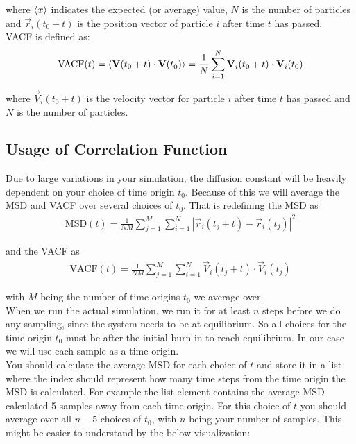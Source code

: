 \documentclass{article}
\begin{document}
where $\langle x \rangle$ indicates the expected (or average) value,
$N$ is the number of particles and $\vec{r}_i(t_0 + t)$ is the position vector of particle $i$ after time $t$ has passed.\\

VACF is defined as:
\begin{eqnarray}
    \mathrm{VACF}(t) = \langle {\bf V}(t_0 + t)\cdot{\bf V}(t_0) \rangle
    = \frac{1}{N} \sum_{i=1}^N {\bf V}_i(t_0 + t) \cdot {\bf V}_i(t_0)
\end{eqnarray}

where
$\vec{V}_i(t_0 + t)$ is the velocity vector for particle $i$ after time $t$ has passed and $N$ is the number of particles.

\newpage

\subsection{Usage of Correlation Function}

Due to large variations in your simulation, the diffusion constant will be heavily dependent on your choice of time origin $t_0$.
Because of this we will average the MSD and VACF over several choices of $t_0$.
That is redefining the MSD as
\begin{eqnarray}
    \mathrm{MSD}(t) = \frac{1}{NM} \sum_{j=1}^M \sum_{i=1}^N | \vec{r}_i(t_j + t) - \vec{r}_i(t_j)  |^2
\end{eqnarray}

and the VACF as 
\begin{eqnarray}
    \mathrm{VACF}(t) = \frac{1}{NM} \sum_{j=1}^M \sum_{i=1}^N \vec{V}_i(t_j + t) \cdot \vec{V}_i(t_j)
\end{eqnarray}

with $M$ being the number of time origins $t_0$ we average over.\\

When we run the actual simulation, we run it for at least $n$ steps before we do any sampling, since the system needs to be at equilibrium.
So all choices for the time origin $t_0$ must be after the initial burn-in to reach equilibrium.
In our case we will use each sample as a time origin.\\

You should calculate the average MSD for each choice of $t$ and store it in a list  where the index should represent how many time steps from the time origin the MSD is calculated.
For example the list element
contains the average MSD calculated 5 samples away from each time origin.
For this choice of $t$ you should average over all $n-5$ choices of $t_0$, with $n$ being your number of samples. 
This might be easier to understand by the below visualization:
\end{document}
